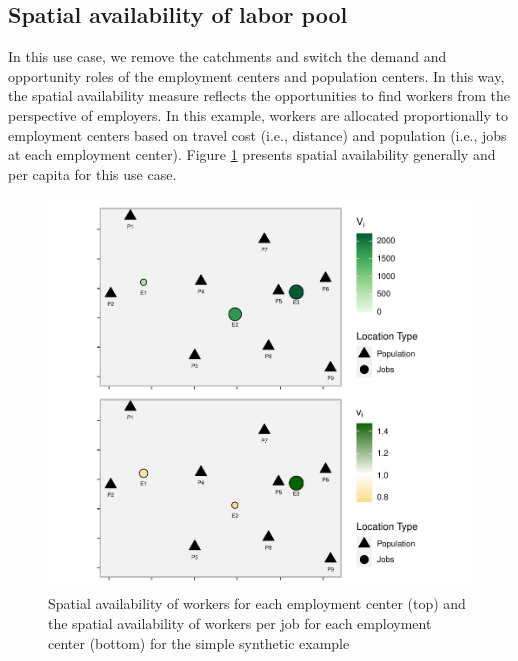 \documentclass[]{elsarticle} %
\begin{document}
\hypertarget{spatial-availability-of-labor-pool}{%
\subsection{Spatial availability of labor
pool}\label{spatial-availability-of-labor-pool}}

In this use case, we remove the catchments and switch the demand and
opportunity roles of the employment centers and population centers. In
this way, the spatial availability measure reflects the opportunities to
find workers from the perspective of employers. In this example, workers
are allocated proportionally to employment centers based on travel cost
(i.e., distance) and population (i.e., jobs at each employment center).
Figure \ref{fig:toy-example-availability-workers-per-job} presents
spatial availability generally and per capita for this use case.

\begin{figure}
\includegraphics[width=1\linewidth]{Spatial-Availability_files/figure-latex/toy-example-availability-workers-per-job-1} \caption{\label{fig:toy-example-availability-workers-per-job} Spatial availability of workers for each employment center (top) and the spatial availability of workers per job for each employment center (bottom) for the simple synthetic example}\label{fig:toy-example-availability-workers-per-job}
\end{figure}
\end{document}

